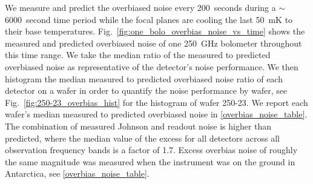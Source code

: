 \documentclass[../EBEXPaper2.tex]{subfiles}
\begin{document}
We measure and predict the overbiased noise
every 200~seconds during a $\sim$6000~second time period while the focal planes are cooling the last 50~mK to their base temperatures.
Fig.~\ref{fig:one_bolo_overbias_noise_vs_time} shows the measured and predicted overbiased noise of one 250~GHz bolometer throughout this time range.  
We take the median ratio of the measured to predicted overbiased noise as representative of the detector's noise performance.
We then histogram the median measured to predicted overbiased noise ratio of each detector on a wafer in order to quantify the noise performance by wafer, see Fig.~\ref{fig:250-23_overbias_hist} for the histogram of wafer 250-23. 
We report each wafer's median measured to predicted overbiased noise in \TAB\ref{overbias_noise_table}. 
The combination of measured Johnson and readout noise is higher than predicted, where the median value of the excess for all detectors across all observation frequency bands is a factor of 1.7.  
Excess overbias noise of roughly the same magnitude was measured when the instrument was on the ground in Antarctica, see \TAB\ref{overbias_noise_table}. 
\end{document}

